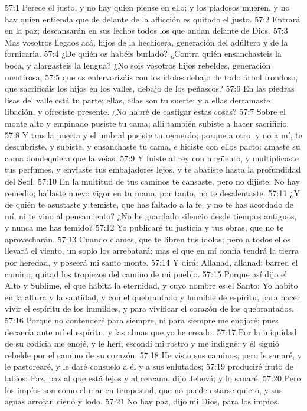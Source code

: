 57:1 Perece el justo, y no hay quien piense en ello; y los piadosos mueren, y no hay quien entienda que de delante de la aflicción es quitado el justo. 
57:2 Entrará en la paz; descansarán en sus lechos todos los que andan delante de Dios. 
57:3 Mas vosotros llegaos acá, hijos de la hechicera, generación del adúltero y de la fornicaria. 
57:4 ¿De quién os habéis burlado? ¿Contra quién ensanchasteis la boca, y alargasteis la lengua? ¿No sois vosotros hijos rebeldes, generación mentirosa, 
57:5 que os enfervorizáis con los ídolos debajo de todo árbol frondoso, que sacrificáis los hijos en los valles, debajo de los peñascos? 
57:6 En las piedras lisas del valle está tu parte; ellas, ellas son tu suerte; y a ellas derramaste libación, y ofreciste presente. ¿No habré de castigar estas cosas? 
57:7 Sobre el monte alto y empinado pusiste tu cama; allí también subiste a hacer sacrificio. 
57:8 Y tras la puerta y el umbral pusiste tu recuerdo; porque a otro, y no a mí, te descubriste, y subiste, y ensanchaste tu cama, e hiciste con ellos pacto; amaste su cama dondequiera que la veías. 
57:9 Y fuiste al rey con ungüento, y multiplicaste tus perfumes, y enviaste tus embajadores lejos, y te abatiste hasta la profundidad del Seol. 
57:10 En la multitud de tus caminos te cansaste, pero no dijiste: No hay remedio; hallaste nuevo vigor en tu mano, por tanto, no te desalentaste. 
57:11 ¿Y de quién te asustaste y temiste, que has faltado a la fe, y no te has acordado de mí, ni te vino al pensamiento? ¿No he guardado silencio desde tiempos antiguos, y nunca me has temido? 
57:12 Yo publicaré tu justicia y tus obras, que no te aprovecharán. 
57:13 Cuando clames, que te libren tus ídolos; pero a todos ellos llevará el viento, un soplo los arrebatará; mas el que en mí confía tendrá la tierra por heredad, y poseerá mi santo monte. 
57:14 Y dirá: Allanad, allanad; barred el camino, quitad los tropiezos del camino de mi pueblo. 
57:15 Porque así dijo el Alto y Sublime, el que habita la eternidad, y cuyo nombre es el Santo: Yo habito en la altura y la santidad, y con el quebrantado y humilde de espíritu, para hacer vivir el espíritu de los humildes, y para vivificar el corazón de los quebrantados. 
57:16 Porque no contenderé para siempre, ni para siempre me enojaré; pues decaería ante mí el espíritu, y las almas que yo he creado. 
57:17 Por la iniquidad de su codicia me enojé, y le herí, escondí mi rostro y me indigné; y él siguió rebelde por el camino de su corazón. 
57:18 He visto sus caminos; pero le sanaré, y le pastorearé, y le daré consuelo a él y a sus enlutados; 
57:19 produciré fruto de labios: Paz, paz al que está lejos y al cercano, dijo Jehová; y lo sanaré. 
57:20 Pero los impíos son como el mar en tempestad, que no puede estarse quieto, y sus aguas arrojan cieno y lodo. 
57:21 No hay paz, dijo mi Dios, para los impíos. 

